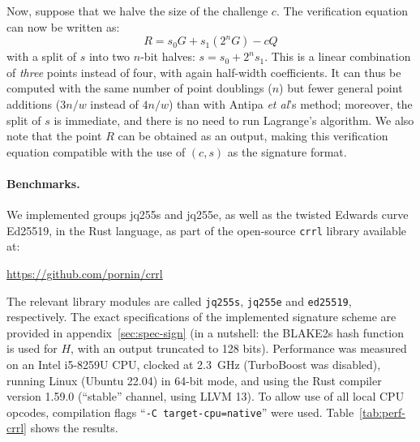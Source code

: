 \documentclass{llncs}
\begin{document}
Now, suppose that we halve the size of the challenge $c$. The verification
equation can now be written as:
\begin{equation*}
    R = s_0 G + s_1 (2^n G) - cQ
\end{equation*}
with a split of $s$ into two $n$-bit halves: $s = s_0 + 2^n s_1$. This
is a linear combination of \emph{three} points instead of four, with
again half-width coefficients. It can thus be computed with the same
number of point doublings ($n$) but fewer general point additions
($3n/w$ instead of $4n/w$) than with Antipa \emph{et al}'s method;
moreover, the split of $s$ is immediate, and there is no need to run
Lagrange's algorithm. We also note that the point $R$ can be obtained
as an output, making this verification equation compatible with the
use of $(c,s)$ as the signature format.

\paragraph{Benchmarks.}
We implemented groups jq255s and jq255e, as well as the twisted
Edwards curve Ed25519, in the Rust language, as part of the open-source
\verb+crrl+ library available at:
\begin{center}
    \url{https://github.com/pornin/crrl}
\end{center}
The relevant library modules are called \verb+jq255s+, \verb+jq255e+ and
\verb+ed25519+, respectively. The exact specifications of the
implemented signature scheme are provided in
appendix~\ref{sec:spec-sign} (in a nutshell: the BLAKE2s hash function
is used for $H$, with an output truncated to 128 bits). Performance was
measured on an Intel i5-8259U CPU, clocked at 2.3~GHz (TurboBoost was
disabled), running Linux (Ubuntu 22.04) in 64-bit mode, and using the
Rust compiler version 1.59.0 (``stable'' channel, using LLVM 13). To
allow use of all local CPU opcodes, compilation flags
``\verb+-C target-cpu=native+'' were used. Table~\ref{tab:perf-crrl}
shows the results.
\end{document}
